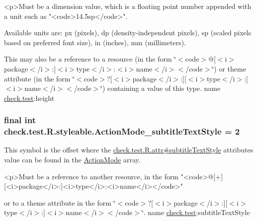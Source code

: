 \begin{DoxyVerb}      <p>Must be a dimension value, which is a floating point number appended with a unit such as "<code>14.5sp</code>".
\end{DoxyVerb}
 Available units are\+: px (pixels), dp (density-\/independent pixels), sp (scaled pixels based on preferred font size), in (inches), mm (millimeters). 

This may also be a reference to a resource (in the form \char`\"{}$<$code$>$@\mbox{[}$<$i$>$package$<$/i$>$\+:\mbox{]}$<$i$>$type$<$/i$>$\+:$<$i$>$name$<$/i$>$$<$/code$>$\char`\"{}) or theme attribute (in the form \char`\"{}$<$code$>$?\mbox{[}$<$i$>$package$<$/i$>$\+:\mbox{]}\mbox{[}$<$i$>$type$<$/i$>$\+:\mbox{]}$<$i$>$name$<$/i$>$$<$/code$>$\char`\"{}) containing a value of this type.  name \hyperlink{namespacecheck_1_1test}{check.\+test}\+:height \hypertarget{classcheck_1_1test_1_1_r_1_1styleable_a4c146f8a39f38c5f2aa884f74d24b896}{}
\subsubsection[{Action\+Mode\+\_\+subtitle\+Text\+Style}]{\setlength{\rightskip}{0pt plus 5cm}final int check.\+test.\+R.\+styleable.\+Action\+Mode\+\_\+subtitle\+Text\+Style = 2\hspace{0.3cm}{\ttfamily [static]}}\label{classcheck_1_1test_1_1_r_1_1styleable_a4c146f8a39f38c5f2aa884f74d24b896}
This symbol is the offset where the \hyperlink{classcheck_1_1test_1_1_r_1_1attr_a9cca12a24b4e55c67ec8573d8aca9d25}{check.\+test.\+R.\+attr\#subtitle\+Text\+Style} attribute\textquotesingle{}s value can be found in the \hyperlink{classcheck_1_1test_1_1_r_1_1styleable_a06d2fd2de1e471a432f3e49eea7b8015}{Action\+Mode} array.

\begin{DoxyVerb}      <p>Must be a reference to another resource, in the form "<code>@[+][<i>package</i>:]<i>type</i>:<i>name</i></code>"
\end{DoxyVerb}
 or to a theme attribute in the form \char`\"{}$<$code$>$?\mbox{[}$<$i$>$package$<$/i$>$\+:\mbox{]}\mbox{[}$<$i$>$type$<$/i$>$\+:\mbox{]}$<$i$>$name$<$/i$>$$<$/code$>$\char`\"{}.  name \hyperlink{namespacecheck_1_1test}{check.\+test}\+:subtitle\+Text\+Style \hypertarget{classcheck_1_1test_1_1_r_1_1styleable_a16a980c21195919de6d38329e1f52a7a}{}
